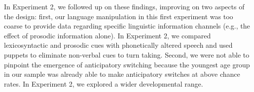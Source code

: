 \documentclass[authoryear, 12pt]{elsarticle}
\begin{document}
In Experiment 2, we followed up on these findings, improving on two aspects of the design: first, our language manipulation in this first experiment was too coarse to provide data regarding specific linguistic information channels (e.g., the effect of prosodic information alone). In Experiment 2, we compared lexicosyntactic and prosodic cues with phonetically altered speech and used puppets to eliminate non-verbal cues to turn taking. Second, we were not able to pinpoint the emergence of anticipatory switching because the youngest age group in our sample was already able to make anticipatory switches at above chance rates. In Experiment 2, we explored a wider developmental range. 


\end{document}

